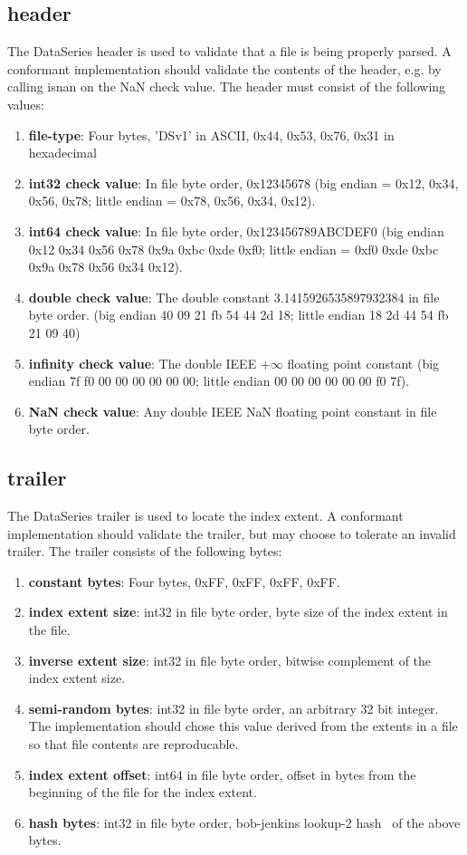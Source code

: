 \subsection{header}

The DataSeries header is used to validate that a file is being
properly parsed. A conformant implementation should validate the
contents of the header, e.g. by calling isnan on the NaN check value.
The header must consist of the following values:

\begin{enumerate}
\item {\bf file-type}: Four bytes, 'DSv1' in ASCII, 0x44, 0x53, 0x76, 0x31 in hexadecimal
\item {\bf int32 check value}: In file byte order, 0x12345678
  (big endian = 0x12, 0x34, 0x56, 0x78; little endian = 0x78, 0x56, 0x34, 0x12).
\item {\bf int64 check value}: In file byte order, 0x123456789ABCDEF0
  (big endian 0x12 0x34 0x56 0x78 0x9a 0xbc 0xde 0xf0; little endian =
  0xf0 0xde 0xbc 0x9a 0x78 0x56 0x34 0x12).
\item {\bf double check value}: The double constant
  3.1415926535897932384 in file byte order.  (big endian 40 09 21 fb
  54 44 2d 18; little endian 18 2d 44 54 fb 21 09 40)
\item {\bf infinity check value}: The double IEEE +$\infty$ floating
  point constant  (big endian 7f f0 00 00 00 00 00 00; little endian
  00 00 00 00 00 00 f0 7f).
\item {\bf NaN check value}: Any double IEEE NaN floating point
  constant in file byte order.
\end{enumerate}

\subsection{trailer}

The DataSeries trailer is used to locate the index extent.  A
conformant implementation should validate the trailer, but may choose
to tolerate an invalid trailer.  The trailer consists of the following
bytes:

\begin{enumerate}
  \item {\bf constant bytes}: Four bytes, 0xFF, 0xFF, 0xFF, 0xFF.
  \item {\bf index extent size}: int32 in file byte order, byte size of
    the index extent in the file.
  \item {\bf inverse extent size}: int32 in file byte order, bitwise
    complement of the index extent size.
  \item {\bf semi-random bytes}: int32 in file byte order, an arbitrary
    32 bit integer.  The implementation should chose this value derived
    from the extents in a file so that file contents are reproducable.
  \item {\bf index extent offset}: int64 in file byte order, offset in
    bytes from the beginning of the file for the index extent.
  \item {\bf hash bytes}: int32 in file byte order, bob-jenkins lookup-2
    hash~\cite{bob-jenkins-hash-lookup-2} of the above bytes. 
\end{enumerate}

